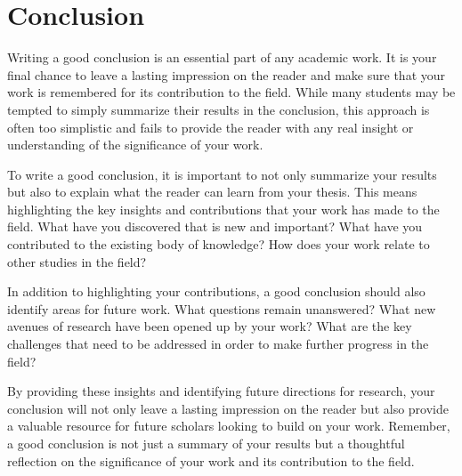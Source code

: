 \chapter{Conclusion} \label{chap:conclusion}

Writing a good conclusion is an essential part of any academic work. It is your final chance to leave a lasting impression on the reader and make sure that your work is remembered for its contribution to the field. While many students may be tempted to simply summarize their results in the conclusion, this approach is often too simplistic and fails to provide the reader with any real insight or understanding of the significance of your work.

To write a good conclusion, it is important to not only summarize your results but also to explain what the reader can learn from your thesis. This means highlighting the key insights and contributions that your work has made to the field. What have you discovered that is new and important? What have you contributed to the existing body of knowledge? How does your work relate to other studies in the field?

In addition to highlighting your contributions, a good conclusion should also identify areas for future work. What questions remain unanswered? What new avenues of research have been opened up by your work? What are the key challenges that need to be addressed in order to make further progress in the field?

By providing these insights and identifying future directions for research, your conclusion will not only leave a lasting impression on the reader but also provide a valuable resource for future scholars looking to build on your work. Remember, a good conclusion is not just a summary of your results but a thoughtful reflection on the significance of your work and its contribution to the field.